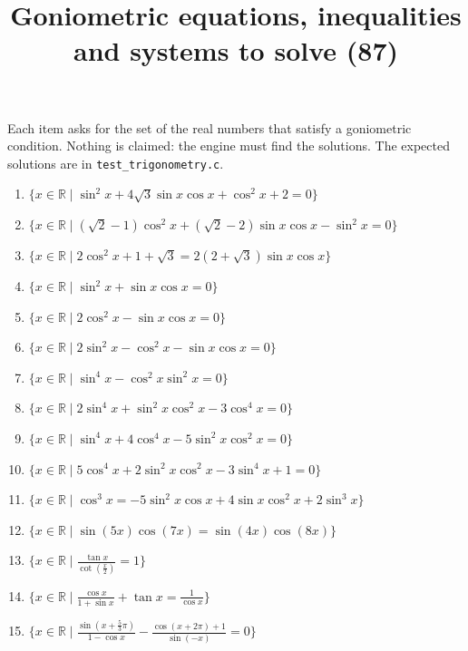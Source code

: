 \documentclass[11pt,a4paper]{article}
\title{Goniometric equations, inequalities and systems to solve (87)}
\author{}
\date{}
\begin{document}
\maketitle
Each item asks for the set of the real numbers that satisfy a goniometric condition. Nothing is claimed: the engine must find the solutions. The expected solutions are in \texttt{test\_trigonometry.c}.

\begin{enumerate}
\item $\displaystyle \{x \in \mathbb{R} \mid \sin^{2} x + 4\sqrt{3}\sin x \cos x + \cos^{2} x + 2 = 0\}$
\item $\displaystyle \{x \in \mathbb{R} \mid (\sqrt{2} - 1)\cos^{2} x + (\sqrt{2} - 2)\sin x \cos x - \sin^{2} x = 0\}$
\item $\displaystyle \{x \in \mathbb{R} \mid 2\cos^{2} x + 1 + \sqrt{3} = 2(2 + \sqrt{3})\sin x \cos x\}$
\item $\displaystyle \{x \in \mathbb{R} \mid \sin^{2} x + \sin x \cos x = 0\}$
\item $\displaystyle \{x \in \mathbb{R} \mid 2\cos^{2} x - \sin x \cos x = 0\}$
\item $\displaystyle \{x \in \mathbb{R} \mid 2\sin^{2} x - \cos^{2} x - \sin x \cos x = 0\}$
\item $\displaystyle \{x \in \mathbb{R} \mid \sin^{4} x - \cos^{2} x \sin^{2} x = 0\}$
\item $\displaystyle \{x \in \mathbb{R} \mid 2\sin^{4} x + \sin^{2} x \cos^{2} x - 3\cos^{4} x = 0\}$
\item $\displaystyle \{x \in \mathbb{R} \mid \sin^{4} x + 4\cos^{4} x - 5\sin^{2} x \cos^{2} x = 0\}$
\item $\displaystyle \{x \in \mathbb{R} \mid 5\cos^{4} x + 2\sin^{2} x \cos^{2} x - 3\sin^{4} x + 1 = 0\}$
\item $\displaystyle \{x \in \mathbb{R} \mid \cos^{3} x = -5\sin^{2} x \cos x + 4\sin x \cos^{2} x + 2\sin^{3} x\}$
\item $\displaystyle \{x \in \mathbb{R} \mid \sin\left(5x\right)\cos\left(7x\right) = \sin\left(4x\right)\cos\left(8x\right)\}$
\item $\displaystyle \{x \in \mathbb{R} \mid \frac{\tan x}{\cot\left(\frac{x}{2}\right)} = 1\}$
\item $\displaystyle \{x \in \mathbb{R} \mid \frac{\cos x}{1 + \sin x} + \tan x = \frac{1}{\cos x}\}$
\item $\displaystyle \{x \in \mathbb{R} \mid \frac{\sin\left(x + \frac{5}{3}\pi\right)}{1 - \cos x} - \frac{\cos\left(x + 2\pi\right) + 1}{\sin\left(-x\right)} = 0\}$

\end{enumerate}
\end{document}
